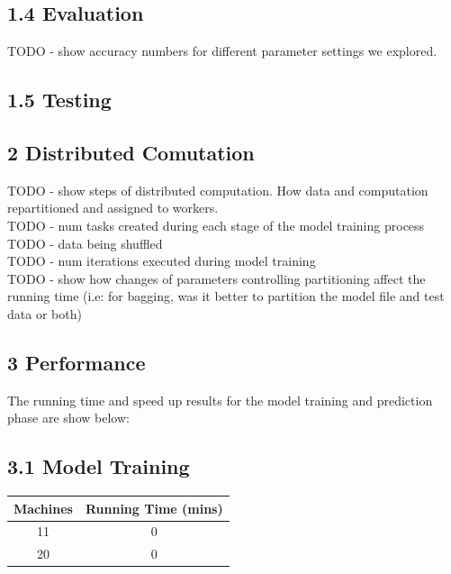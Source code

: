 \documentclass{neu_handout}
\begin{document}
\subsection*{1.4 Evaluation}

TODO - show accuracy numbers for different parameter settings we explored.


\subsection*{1.5 Testing}



\subsection*{2 Distributed Comutation}

TODO - show steps of distributed computation. How data and computation repartitioned and assigned to workers.\\

TODO - num tasks created during each stage of the model training process \\

TODO - data being shuffled \\

TODO - num iterations executed during model training \\

TODO - show how changes of parameters controlling partitioning affect the running time (i.e: for bagging, was it better to partition the model file and test data or both) \\


\subsection*{3 Performance}
The running time and speed up results for the model training and prediction phase are show below:

\subsection*{3.1 Model Training}

\begin{center}
 \begin{tabular}{||c c ||} 
 \hline
Machines & Running Time (mins) \\ [0.5ex] 
 \hline\hline
 11 & 0  \\ 
  \hline
 20 & 0  \\ [1ex] 
 \hline
\end{tabular}
\end{center}
\end{document}
